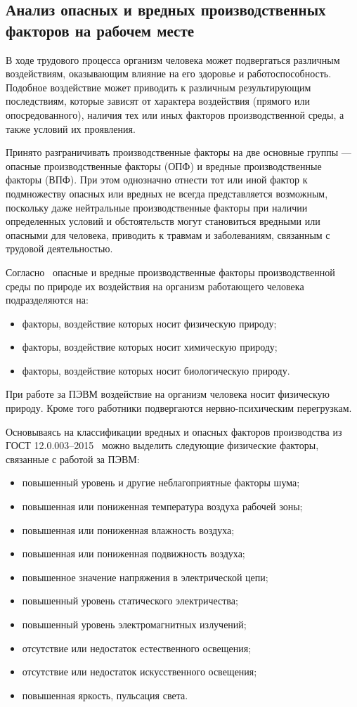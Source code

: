 \subsection{Анализ опасных и вредных производственных факторов на рабочем месте}

В ходе трудового процесса организм человека может подвергаться различным воздействиям, 
оказывающим влияние на его здоровье и работоспособность. Подобное воздействие может приводить к 
различным результирующим последствиям, которые зависят от характера воздействия (прямого или
опосредованного), наличия тех или иных факторов производственной среды, а также условий
их проявления. 

Принято разграничивать производственные факторы на две основные группы --- опасные производственные факторы
(ОПФ) и вредные производственные факторы (ВПФ). При этом однозначно отнести тот или иной
фактор к подмножеству опасных или вредных не всегда представляется возможным, поскольку
даже нейтральные производственные факторы при наличии определенных условий и обстоятельств
могут становиться вредными или опасными для человека, приводить к травмам и заболеваниям, 
связанным с трудовой деятельностью.

Согласно~\cite{gost_12.0.003-2015} опасные и вредные производственные факторы производственной
среды по природе их воздействия на организм работающего человека подразделяются на:
\begin{itemize}
 \item факторы, воздействие которых носит физическую природу;
 \item факторы, воздействие которых носит химическую природу;
 \item факторы, воздействие которых носит биологическую природу.
\end{itemize}

При работе за ПЭВМ воздействие на организм человека носит физическую природу. Кроме того
работники подвергаются нервно-психическим перегрузкам.

Основываясь на классификации вредных и опасных факторов производства из ГОСТ 12.0.003--2015~\cite{gost_12.0.003-2015} 
можно выделить следующие физические факторы, связанные с работой за ПЭВМ:
\begin{itemize}
 \item повышенный уровень и другие неблагоприятные факторы шума;
 \item повышенная или пониженная температура воздуха рабочей зоны;
 \item повышенная или пониженная влажность воздуха;
 \item повышенная или пониженная подвижность воздуха;
 \item повышенное значение напряжения в электрической цепи;
 \item повышенный уровень статического электричества;
 \item повышенный уровень электромагнитных излучений;
 \item отсутствие или недостаток естественного освещения;
 \item отсутствие или недостаток искусственного освещения;
 \item повышенная яркость, пульсация света. 
\end{itemize}

